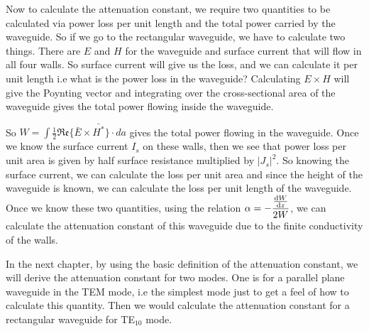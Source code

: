 Now to calculate the attenuation constant, we require two quantities to be calculated via power loss per unit length and the total power carried by the waveguide. So if we go to the rectangular waveguide, we have to calculate two things. There are $E$ and $H$ for the waveguide and surface current that will flow in all four walls. So surface current will give us the loss, and we can calculate it per unit length i.e what is the power loss in the waveguide? Calculating $E\times H$ will give the Poynting vector and integrating over the cross-sectional area of the waveguide gives the total power flowing inside the waveguide. 

So $W = \int\frac{1}{2}\mathfrak{Re}\{\bar{E}\times\bar{H^*}\}\cdot{da}$ gives the total power flowing in  the waveguide. Once we know the surface current $I_{s}$ on these walls, then we see that power loss per unit area is given by half surface resistance multiplied by $|J_{s}|^{2}$. So knowing the surface current, we can calculate the loss per unit area and since the height of the waveguide is known, we can calculate the loss per unit length of the waveguide. Once we know these two quantities, using the relation $\alpha = -\dfrac{\dv{W}{z}}{2W}$, we can calculate the attenuation constant of this waveguide due to the finite conductivity of the walls.

In the next chapter, by using the basic definition of the attenuation constant, we will derive the attenuation constant for two modes. One is for a parallel plane waveguide in the TEM mode, i.e the simplest mode just to get a feel of how to calculate this quantity. Then we would calculate the attenuation constant for a rectangular waveguide for TE$_{10}$ mode. 